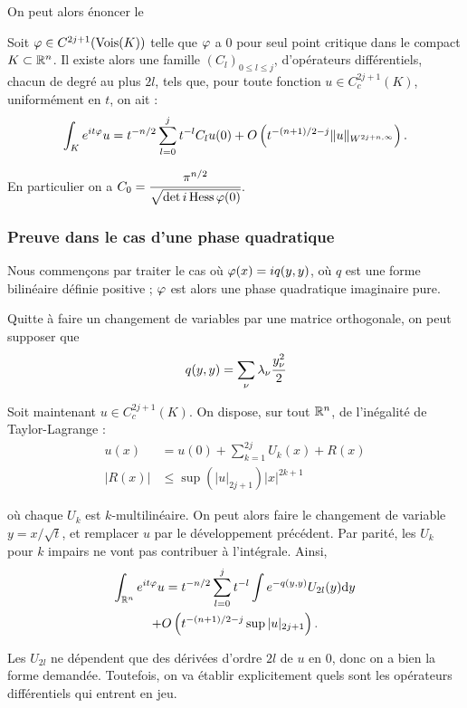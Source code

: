  On peut alors énoncer le 
\begin{theorem}\label{th:phasestat}Soit $\varphi
  \in C^{2j+1}(\operatorname{Vois}(K))$ telle que $\varphi$ a $0$ pour seul point critique dans le compact $K \subset \mathbb{R}^n$.
Il existe alors une famille $(C_l)_{0 \leq l \leq j}$, d'opérateurs
différentiels, chacun de degré au plus $2l$, tels que, pour toute fonction $u\in C_c^{2j+1}(K)$, uniformément en $t$, on ait :
\begin{equation*}
  \int_Ke^{it\varphi}u = t^{-n/2}\sum_{l=0}^{j}t^{-l}C_lu(0) + O\left(t^{-(n+1)/2-j}\|u\|_{W^{2j+n,\infty}}\right).
\end{equation*}

En particulier on a $C_0 = \cfrac{\pi^{n/2}}{\sqrt{\det i\operatorname{Hess}{\varphi}(0)}}$.
\end{theorem}

\subsubsection{Preuve dans le cas d'une phase quadratique}
Nous commençons par traiter le cas où $\varphi(x)=iq(y,y)$, où $q$ est une forme bilinéaire définie positive ; $\varphi$ est alors une phase quadratique imaginaire pure.

Quitte à faire un changement de variables par une matrice orthogonale, on peut supposer que 
\begin{equation*}
  q(y,y)=\sum_{\nu}\lambda_{\nu}\cfrac{y_{\nu}^2}{2}
\end{equation*}

Soit maintenant $u\in C_c^{2j+1}(K)$. On dispose, sur tout $\mathbb{R}^n$, de l'inégalité de Taylor-Lagrange :
\begin{align*}
  u(x)&=u(0) + \sum_{k=1}^{2j}U_k(x)+R(x)\\
  |R(x)| &\leq \sup(|u|_{2j+1})|x|^{2k+1}
\end{align*}

\noindent où chaque $U_k$ est $k$-multilinéaire. On peut alors faire le changement de variable $y = x/\sqrt{t}$, et remplacer $u$ par le développement précédent. Par parité, les $U_k$ pour $k$ impairs ne vont pas contribuer à l'intégrale. Ainsi,
\begin{multline*}
  \int_{\mathbb{R}^n}e^{it\varphi}u = t^{-n/2}\sum_{l=0}^{j}t^{-l}\int
  e^{-q(y,y)}U_{2l}(y)\mathrm{d} y \\+ O\left(t^{-(n+1)/2-j}\sup |u|_{2j+1}\right).
\end{multline*}

Les $U_{2l}$ ne dépendent que des dérivées d'ordre $2l$ de $u$ en $0$, donc on a bien la forme demandée. Toutefois, on va établir explicitement quels sont les opérateurs différentiels qui entrent en jeu.

